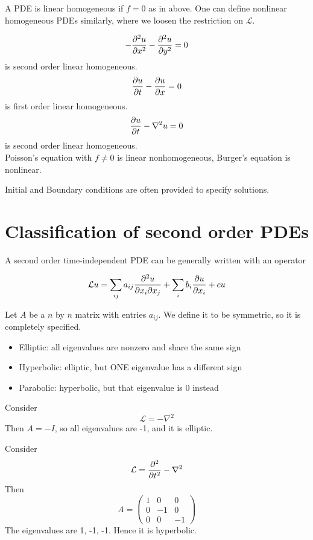 \documentclass[12pt]{article}
\begin{document}
\begin{defn}
    A PDE is linear homogeneous if $f=0$ as in above. One can define nonlinear homogeneous PDEs similarly, where we loosen the restriction on $\mathcal L$.
\end{defn}

\begin{ex}
    $$-\frac{\partial ^2u}{\partial x^2}-\frac{\partial ^2u}{\partial y^2} = 0$$
    is second order linear homogeneous.
    $$\frac{\partial u}{\partial t} - \frac{\partial u}{\partial x} = 0$$
    is first order linear homogeneous.
    $$\frac{\partial u}{\partial t} - \nabla^2u = 0$$
    is second order linear homogeneous. \\
    Poisson's equation with $f\neq0$ is linear nonhomogeneous, Burger's equation is nonlinear.
\end{ex}

Initial and Boundary conditions are often provided to specify solutions.

\section{Classification of second order PDEs}

A second order time-independent PDE can be generally written with an operator

\begin{equation}
    \mathcal Lu = \sum_{ij} a_{ij}\frac{\partial^2u}{\partial x_i\partial x_j} + \sum_i b_i\frac{\partial u}{\partial x_i} + cu
\end{equation}

Let $A$ be a $n$ by $n$ matrix with entries $a_{ij}$. We define it to be symmetric, so it is completely specified.

\begin{itemize}
    \item Elliptic: all eigenvalues are nonzero and share the same sign
    \item Hyperbolic: elliptic, but ONE eigenvalue has a different sign
    \item Parabolic: hyperbolic, but that eigenvalue is 0 instead
\end{itemize}

\begin{ex}[Laplace]
    Consider
    $$\mathcal L = -\nabla^2$$
    Then $A = -I$, so all eigenvalues are -1, and it is elliptic.
\end{ex}

\begin{ex}[Wave]
    Consider
    $$\mathcal L = \frac{\partial ^2}{\partial t^2} - \nabla^2$$
    Then
    $$A = \begin{pmatrix} 1 & 0 & 0 \\ 0 & -1 & 0 \\ 0 & 0 & -1 \end{pmatrix}$$
    The eigenvalues are 1, -1, -1. Hence it is hyperbolic.
\end{ex}
\end{document}
